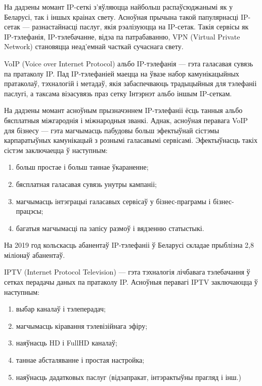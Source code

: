 \sectionWithoutNumber{\prefacename}

На дадзены момант IP-сеткі з'яўляюцца найбольш распаўсюджанымі як
у Беларусі, так і іншых краінах свету. Асноўная прычына такой
папулярнасці IP-сетак --- разнастайнасці паслуг, якія рэалізуюцца
на IP-сетак. Такія сервісы як IP-тэлефанія, IP-тэлебачанне, відэа
па патрабаванню, VPN (Virtual Private Network) становяцца
неад'емнай часткай сучаснага свету.

VoIP (Voice over Internet Protocol) альбо IP-тэлефанія --- гэта
галасавая сувязь па пратаколу IP. Пад IP-тэлефаніей маецца на ўвазе
набор камунікацыйных пратаколаў, тэхналогій і метадаў, якія
забаспечваюць традыцыйныя для тэлефаніі паслугі, а таксама віэасувязь
праз сетку Інтэрнэт альбо іншым IP-сеткам.

На дадзены момант асноўным прызначэннем IP-тэлефаніі ёсць танныя альбо
бясплатныя міжгароднія і міжнародныя званкі. Аднак, асноўная перавага
VoIP для бізнесу --- гэта магчымасць пабудовы больш эфектыўнай сістэмы
карпаратыўных камунікацый з рознымі галасавымі сервісамі.
Эфектыўнасць такіх сістэм заключаецца ў наступным:
\begin{enumerate}
    \item больш простае і больш таннае ўкараненне;
    \item бясплатная галасавая сувязь унутры кампаніі;
    \item магчымасць інтэграцыі галасавых сервісаў у
          бізнес-праграмы і бізнес-працэсы;
    \item багатыя магчымасці па запісу размоў і вядзенню статыстыкі.
\end{enumerate}

На 2019 год кольскасць абанентаў IP-тэлефаніі ў Беларусі складае
прыблізна 2,8 міліонаў абанентаў.

IPTV (Internet Protocol Television) --- гэта тэхналогія лічбавага
тэлебачання ў сетках перадачы даных па пратаколу IP.
Асноўныя перавагі IPTV заключаюцца ў наступным:
\begin{enumerate}
    \item выбар каналаў і тэлеперадач;
    \item магчымасць кіравання тэлевізійнага эфіру;
    \item наяўнасць HD і FullHD каналаў;
    \item таннае абсталяванне і простая настройка;
    \item наяўнасць дадатковых паслуг (відэапракат, інтэрактыўны прагляд
          і інш.)
\end{enumerate}

